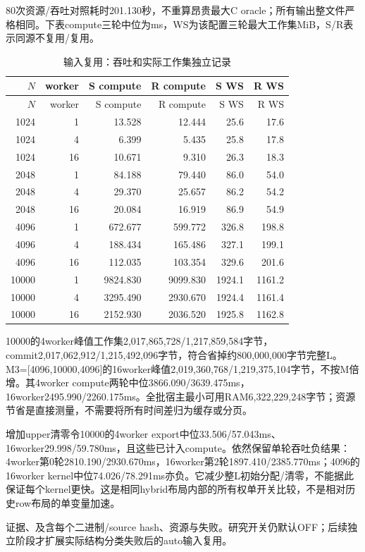 \documentclass[UTF8,a4paper,11pt]{ctexart}
\begin{document}
80次资源/吞吐对照耗时201.130秒，不重算昂贵最大C oracle；所有输出整文件严格相同。下表compute三轮中位为ms，WS为该配置三轮最大工作集MiB，S/R表示同源不复用/复用。
\begin{longtable}{@{}rr rrrr@{}}
\caption{输入复用：吞吐和实际工作集独立记录}\\\toprule
$N$&worker&S compute&R compute&S WS&R WS\\\midrule\endfirsthead
\toprule$N$&worker&S compute&R compute&S WS&R WS\\\midrule\endhead
1024&1&13.528&12.444&25.6&17.6\\
1024&4&6.399&5.435&25.8&17.8\\
1024&16&10.671&9.310&26.3&18.3\\
2048&1&84.188&79.440&86.0&54.0\\
2048&4&29.370&25.657&86.2&54.2\\
2048&16&20.084&16.919&86.9&54.9\\
4096&1&672.677&599.772&326.8&198.8\\
4096&4&188.434&165.486&327.1&199.1\\
4096&16&112.035&103.354&329.6&201.6\\
10000&1&9824.830&9099.830&1924.1&1161.2\\
10000&4&3295.490&2930.670&1924.4&1161.4\\
10000&16&2152.930&2036.520&1925.8&1162.8\\
\bottomrule\end{longtable}

10000的4worker峰值工作集2,017,865,728/\allowbreak{}1,217,859,584字节，commit2,017,062,912/\allowbreak{}1,215,492,096字节，符合省掉约800,000,000字节完整L。M3=[4096,10000,4096]的16worker峰值2,019,360,768/\allowbreak{}1,219,375,104字节，不按M倍增。其4worker compute两轮中位3866.090/\allowbreak{}3639.475ms，16worker2495.990/\allowbreak{}2260.175ms。全批宿主最小可用RAM6,322,229,248字节；资源节省是直接测量，不需要将所有时间差归为缓存或分页。

增加upper清零令10000的4worker export中位33.506/\allowbreak{}57.043ms、16worker29.998/\allowbreak{}59.780ms，且这些已计入compute。依然保留单轮吞吐负结果：4worker第0轮2810.190/\allowbreak{}2930.670ms，16worker第2轮1897.410/\allowbreak{}2385.770ms；4096的16worker kernel中位74.026/\allowbreak{}78.291ms亦负。它减少整L初始分配/清零，不能据此保证每个kernel更快。这是相同hybrid布局内部的所有权单开关比较，不是相对历史row布局的单变量加速。

证据、及含每个二进制/source hash、资源与失败。研究开关仍默认OFF；后续独立阶段才扩展实际结构分类失败后的auto输入复用。
\end{document}
